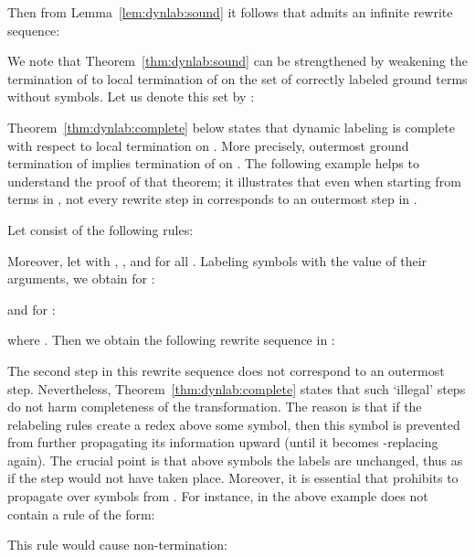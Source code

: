   Then from Lemma~\ref{lem:dynlab:sound} it follows that 
   admits an infinite rewrite sequence: 


We note that Theorem~\ref{thm:dynlab:sound} can be strengthened
by weakening the termination of 
to local termination of  on 
the set of correctly labeled ground terms without  symbols.
Let us denote this set by :


Theorem~\ref{thm:dynlab:complete} below states
that dynamic labeling is complete with respect to 
local termination on .
More precisely, outermost ground termination of  implies termination of 
 on .
The following example helps to understand the proof of that theorem;
it illustrates that even when starting from terms in
, not every rewrite step in 
 corresponds to an outermost step in .

\begin{example}\label{ex:dyncomplete}
  Let  consist of the following rules:
  
  Moreover, let  with
  , ,
  and  for all .
  Labeling symbols with the value of their arguments, 
  we obtain for :
  
  and for :
  
  where .
  Then we obtain the following rewrite sequence in :
  
  The second step in this rewrite sequence
  does not correspond to an outermost step.
  Nevertheless, Theorem~\ref{thm:dynlab:complete}
  states that such `illegal' steps do not harm completeness of the transformation.
  The reason is that if the relabeling rules create a redex above
  some  symbol, then this  symbol
  is prevented from further propagating its information upward
  (until it becomes -replacing again).
  The crucial point is that above  symbols
  the labels are unchanged, thus as if the step would not have taken place.
  Moreover, it is essential that  
  prohibits  to propagate over symbols from .
  For instance, in the above example 
  does not contain a rule of the form:
  
  This rule would cause non-termination: 
  
\end{example}


